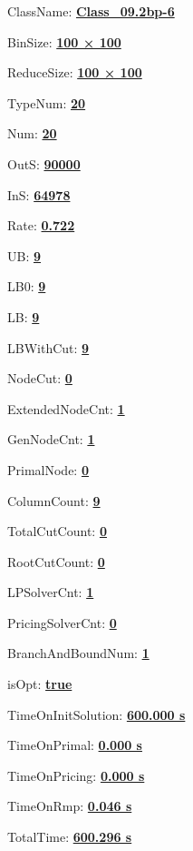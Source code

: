 \documentclass[11pt]{article}
\begin{document}
\pagestyle{empty}


ClassName: \underline{\textbf{Class_09.2bp-6}}
\par
BinSize: \underline{\textbf{100 × 100}}
\par
ReduceSize: \underline{\textbf{100 × 100}}
\par
TypeNum: \underline{\textbf{20}}
\par
Num: \underline{\textbf{20}}
\par
OutS: \underline{\textbf{90000}}
\par
InS: \underline{\textbf{64978}}
\par
Rate: \underline{\textbf{0.722}}
\par
UB: \underline{\textbf{9}}
\par
LB0: \underline{\textbf{9}}
\par
LB: \underline{\textbf{9}}
\par
LBWithCut: \underline{\textbf{9}}
\par
NodeCut: \underline{\textbf{0}}
\par
ExtendedNodeCnt: \underline{\textbf{1}}
\par
GenNodeCnt: \underline{\textbf{1}}
\par
PrimalNode: \underline{\textbf{0}}
\par
ColumnCount: \underline{\textbf{9}}
\par
TotalCutCount: \underline{\textbf{0}}
\par
RootCutCount: \underline{\textbf{0}}
\par
LPSolverCnt: \underline{\textbf{1}}
\par
PricingSolverCnt: \underline{\textbf{0}}
\par
BranchAndBoundNum: \underline{\textbf{1}}
\par
isOpt: \underline{\textbf{true}}
\par
TimeOnInitSolution: \underline{\textbf{600.000 s}}
\par
TimeOnPrimal: \underline{\textbf{0.000 s}}
\par
TimeOnPricing: \underline{\textbf{0.000 s}}
\par
TimeOnRmp: \underline{\textbf{0.046 s}}
\par
TotalTime: \underline{\textbf{600.296 s}}
\par
\newpage


\end{document}
